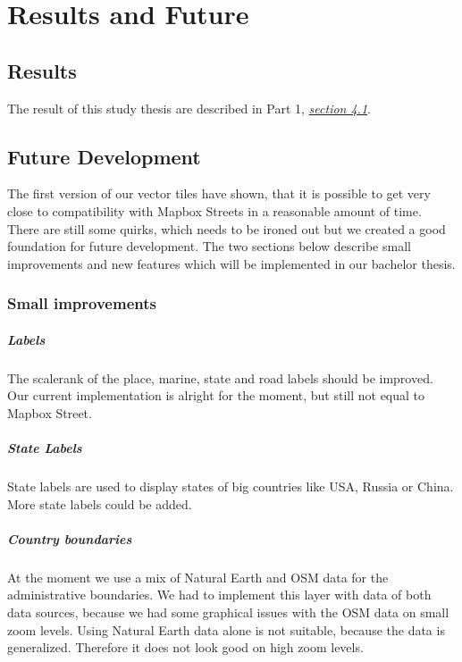\chapter{Results and Future}\label{part2_results_and_future}

\section{Results}\label{part2_results}
The result of this study thesis are described in Part 1, \hyperref[part1_results]{\emph{section 4.1}}.

\section{Future Development}\label{part2_future_development}
The first version of our vector tiles have shown, that it is possible to get very close to compatibility with Mapbox Streets in a reasonable amount of time. There are still some quirks, which needs to be ironed out but we created a good foundation for future development. The two sections below describe small improvements and new features which will be implemented in our bachelor thesis.

\subsection{Small improvements}\label{small_improvements}
 
\paragraph{Labels}
The scalerank of the place, marine, state and road labels should be improved. Our current implementation is alright for the moment, but still not equal to Mapbox Street.

\paragraph{State Labels}
State labels are used to display states of big countries like USA, Russia or China. More state labels could be added. 

\paragraph{Country boundaries}
At the moment we use a mix of Natural Earth and OSM data for the administrative boundaries. We had to implement this layer with data of both data sources, because we had some graphical issues with the OSM data on small zoom levels. Using Natural Earth data alone is not suitable, because the data is generalized. Therefore it does not look good on high zoom levels.

